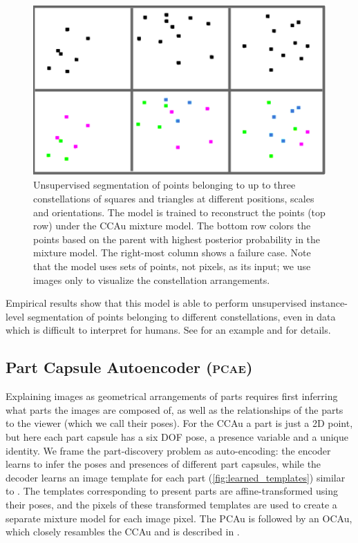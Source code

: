 \begin{figure}
	\centering
		\includegraphics[width=.35\linewidth]{figures/SCA/consinvert5}
		\caption{
			Unsupervised segmentation of points belonging to up to three constellations of squares and triangles at different positions, scales and orientations. 
			The model is trained to reconstruct the points (top row) under the \gls{CCAu} mixture model. The bottom row colors the points based on the parent with highest posterior probability in the mixture model. 
			The right-most column shows a failure case.
			Note that the model uses sets of points, not pixels, as its input; we use images  only to visualize the constellation arrangements.
		}
		\label{fig:constellations}
\end{figure}
Empirical results show that this model is able to perform unsupervised instance-level segmentation of points belonging to different constellations, even in data which is difficult to interpret for humans. See  for an example and  for details.

\subsection{Part Capsule Autoencoder (\textsc{pcae})}
\label{sec:img_capsule}
Explaining images as geometrical arrangements of parts requires first inferring what parts the images are composed of, as well as the relationships of the parts to the viewer (which we call their poses). For the \gls{CCAu} a part is just a 2D point, but here each part capsule has a six \gls{DOF} pose, a presence variable and a unique identity. We frame the part-discovery problem as auto-encoding: the encoder learns to infer the poses and presences of different part capsules, while the decoder learns an image template for each part (\cref{fig:learned_templates}) similar to \cite{Tieleman2014thesis,Eslami2016air}. The templates corresponding to present parts are affine-transformed using their poses, and the pixels of these transformed templates are used to create a separate mixture model for each image pixel.
The \gls{PCAu} is followed by an \gls{OCAu}, which closely resambles the \gls{CCAu} and is described in .

